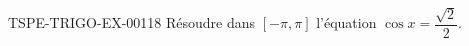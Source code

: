 \begin{exercice}{TSPE-TRIGO-EX-001}{1}{8}
Résoudre dans $[-\pi, \pi]$ l'équation $\cos x = \dfrac{\sqrt{2}}{2}$.
\end{exercice}
